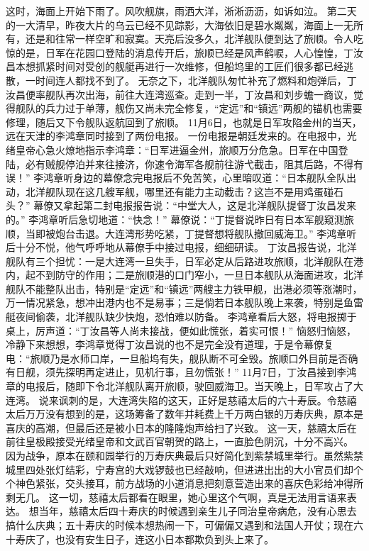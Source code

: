 \documentclass[12pt,UTF8]{ctexbook}
\begin{document}
这时，海面上开始下雨了。风吹舰旗，雨洒大洋，淅淅沥沥，如诉如泣。
第二天的一大清早，昨夜大片的乌云已经不见踪影，大海依旧是碧水粼粼，海面上一无所有，还是和往常一样空旷和寂寞。天亮后没多久，北洋舰队便到达了旅顺。令人吃惊的是，日军在花园口登陆的消息传开后，旅顺已经是风声鹤唳，人心惶惶，丁汝昌本想抓紧时间对受创的舰艇再进行一次维修，但船坞里的工匠们很多都已经逃散，一时间连人都找不到了。
无奈之下，北洋舰队匆忙补充了燃料和炮弹后，丁汝昌便率舰队再次出海，前往大连湾巡查。走到一半，丁汝昌和刘步蟾一商议，觉得舰队的兵力过于单薄，舰伤又尚未完全修复，“定远”和“镇远”两舰的锚机也需要修理，随后又下令舰队返航回到了旅顺。
11月6日，也就是日军攻陷金州的当天，远在天津的李鸿章同时接到了两份电报。
一份电报是朝廷发来的。在电报中，光绪皇帝心急火燎地指示李鸿章：“日军进逼金州，旅顺万分危急。日军在中国登陆，必有贼舰停泊并来往接济，你速令海军各舰前往游弋截击，阻其后路，不得有误！”
李鸿章听身边的幕僚念完电报后不免苦笑，心里暗叹道：“日本舰队全队出动，北洋舰队现在这几艘军舰，哪里还有能力主动截击？这岂不是用鸡蛋碰石头？”
幕僚又拿起第二封电报报告说：“中堂大人，这是北洋舰队提督丁汝昌发来的。”
李鸿章听后急切地道：“快念！”
幕僚说：“丁提督说昨日有日本军舰窥测旅顺，当即被炮台击退。大连湾形势吃紧，丁提督想将舰队撤回威海卫。”
李鸿章听后十分不悦，他气呼呼地从幕僚手中接过电报，细细研读。
丁汝昌报告说，北洋舰队有三个担忧：一是大连湾一旦失手，日军必定从后路进攻旅顺，北洋舰队在港内，起不到防守的作用；二是旅顺港的口门窄小，一旦日本舰队从海面进攻，北洋舰队不能整队出击，特别是“定远”和“镇远”两艘主力铁甲舰，出港必须等涨潮时，万一情况紧急，想冲出港内也不是易事；三是倘若日本舰队晚上来袭，特别是鱼雷艇夜间偷袭，北洋舰队缺少快炮，恐怕难以防备。
李鸿章看后大怒，将电报掷于桌上，厉声道：“丁汝昌等人尚未接战，便如此慌张，着实可恨！”
恼怒归恼怒，冷静下来想想，李鸿章觉得丁汝昌说的也不是完全没有道理，于是令幕僚复电：“旅顺乃是水师口岸，一旦船坞有失，舰队断不可全毁。旅顺口外目前是否确有日舰，须先探明再定进止，见机行事，且勿慌张！”
11月7日，丁汝昌接到李鸿章的电报后，随即下令北洋舰队离开旅顺，驶回威海卫。当天晚上，日军攻占了大连湾。
说来讽刺的是，大连湾失陷的这天，正好是慈禧太后的六十寿辰。令慈禧太后万万没有想到的是，这场筹备了数年并耗费上千万两白银的万寿庆典，原本是喜庆的高潮，但最后还是被小日本的隆隆炮声给扫了兴致。
这一天，慈禧太后在前往皇极殿接受光绪皇帝和文武百官朝贺的路上，一直脸色阴沉，十分不高兴。
因为战争，原本在颐和园举行的万寿庆典最后只好简化到紫禁城里举行。虽然紫禁城里四处张灯结彩，宁寿宫的大戏锣鼓也已经敲响，但进进出出的大小官员们却个个神色紧张，交头接耳，前方战场的小道消息把刻意营造出来的喜庆色彩给冲得所剩无几。
这一切，慈禧太后都看在眼里，她心里这个气啊，真是无法用言语来表达。
想当年，慈禧太后四十寿庆的时候遇到亲生儿子同治皇帝病危，没有心思去搞什么庆典；五十寿庆的时候本想热闹一下，可偏偏又遇到和法国人开仗；现在六十寿庆了，也没有安生日子，连这小日本都欺负到头上来了。
\end{document}
